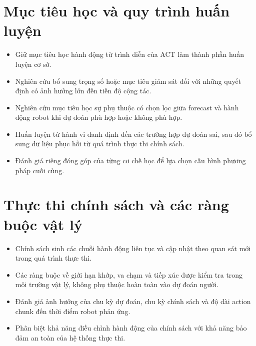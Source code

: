 \section{Mục tiêu học và quy trình huấn luyện}

\begin{itemize}
    \item Giữ mục tiêu học hành động từ trình diễn của ACT làm thành phần huấn luyện cơ sở.

    \item Nghiên cứu bổ sung trọng số hoặc mục tiêu giám sát đối với những quyết định có ảnh hưởng lớn đến tiến độ cộng tác.

    \item Nghiên cứu mục tiêu học sự phụ thuộc có chọn lọc giữa forecast và hành động robot khi dự đoán phù hợp hoặc không phù hợp.

    \item Huấn luyện từ hành vi danh định đến các trường hợp dự đoán sai, sau đó bổ sung dữ liệu phục hồi từ quá trình thực thi chính sách.

    \item Đánh giá riêng đóng góp của từng cơ chế học để lựa chọn cấu hình phương pháp cuối cùng.
\end{itemize}


\section{Thực thi chính sách và các ràng buộc vật lý}

\begin{itemize}
    \item Chính sách sinh các chuỗi hành động liên tục và cập nhật theo quan sát mới trong quá trình thực thi.

    \item Các ràng buộc về giới hạn khớp, va chạm và tiếp xúc được kiểm tra trong môi trường vật lý, không phụ thuộc hoàn toàn vào dự đoán người.

    \item Đánh giá ảnh hưởng của chu kỳ dự đoán, chu kỳ chính sách và độ dài action chunk đến thời điểm robot phản ứng.

    \item Phân biệt khả năng điều chỉnh hành động của chính sách với khả năng bảo đảm an toàn của hệ thống thực thi.
\end{itemize}


